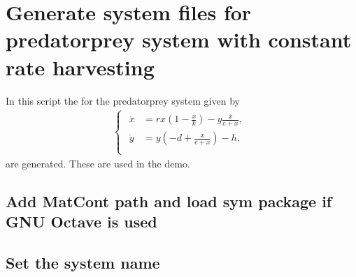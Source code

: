 \documentclass[letterpaper,10pt,english]{jupyterBook}
\begin{document}
\chapter{Generate system files for predator\sphinxhyphen{}prey system with constant rate harvesting}
\label{\detokenize{PredatorPreyGenSym:generate-system-files-for-predator-prey-system-with-constant-rate-harvesting}}\label{\detokenize{PredatorPreyGenSym::doc}}
\sphinxAtStartPar
In this script the  for the predator\sphinxhyphen{}prey system given by
\begin{equation*}
\begin{split}
\begin{cases}
\begin{aligned}
\dot x &= rx\left(1-\frac x k\right) - y \frac x {e+x}, \\
\dot y &= y\left(-d+\frac x {e+x}\right) - h, \\
\end{aligned}
\end{cases}
\end{split}
\end{equation*}
\sphinxAtStartPar
are generated. These are used in the {\hyperref[\detokenize{PredatorPrey::doc}]{}} demo.


\section{Add MatCont path and load sym package if GNU Octave is used}
\label{\detokenize{PredatorPreyGenSym:add-matcont-path-and-load-sym-package-if-gnu-octave-is-used}}
\begin{sphinxVerbatim}[commandchars=\\\{\}]
  
\PYG{p}{[} \PYG{p}{]}
 
        
\end{sphinxVerbatim}


\section{Set the system name}
\label{\detokenize{PredatorPreyGenSym:set-the-system-name}}
\begin{sphinxVerbatim}[commandchars=\\\{\}]
  
\end{sphinxVerbatim}
\end{document}
